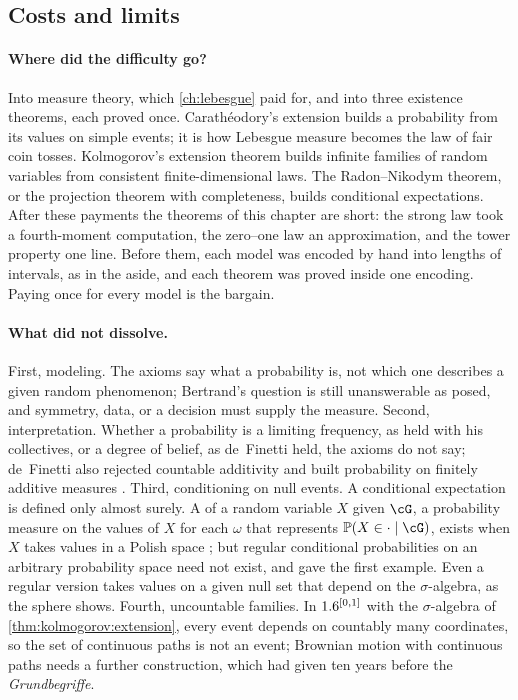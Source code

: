 \begin{refsection}
\section{Costs and limits}\label{sec:kolmogorov:costs}

\paragraph{Where did the difficulty go?} Into measure theory, which \cref{ch:lebesgue} paid for, and into three existence theorems, each proved once. Carathéodory's extension builds a probability from its values on simple events; it is how Lebesgue measure becomes the law of fair coin tosses. Kolmogorov's extension theorem builds infinite families of random variables from consistent finite-dimensional laws. The Radon--Nikodym theorem, or the projection theorem with completeness, builds conditional expectations. After these payments the theorems of this chapter are short: the strong law took a fourth-moment computation, the zero--one law an approximation, and the tower property one line. Before them, each model was encoded by hand into lengths of intervals, as in the aside, and each theorem was proved inside one encoding. Paying once for every model is the bargain.

\paragraph{What did not dissolve.} First, modeling. The axioms say what a probability is, not which one describes a given random phenomenon; Bertrand's question is still unanswerable as posed, and symmetry, data, or a decision must supply the measure. Second, interpretation. Whether a probability is a limiting frequency, as \textcite{vonMises1919} held with his collectives, or a degree of belief, as de~Finetti held, the axioms do not say; de~Finetti also rejected countable additivity and built probability on finitely additive measures \parencite{deFinetti1974}. Third, conditioning on null events. A conditional expectation is defined only almost surely. A  of a random variable $X$ given $\cG$, a probability measure on the values of $X$ for each $\omega$ that represents $\kolP(X\in\cdot\mid\cG)$, exists when $X$ takes values in a Polish space \parencite[§4.1]{Durrett2019}; but regular conditional probabilities on an arbitrary probability space need not exist, and \textcite{Dieudonne1948} gave the first example. Even a regular version takes values on a given null set that depend on the $\sigma$-algebra, as the sphere shows. Fourth, uncountable families. In $1.6^{[0,1]}$ with the $\sigma$-algebra of \cref{thm:kolmogorov:extension}, every event depends on countably many coordinates, so the set of continuous paths is not an event; Brownian motion with continuous paths needs a further construction, which \textcite{Wiener1923} had given ten years before the \emph{Grundbegriffe}.


\end{refsection}
